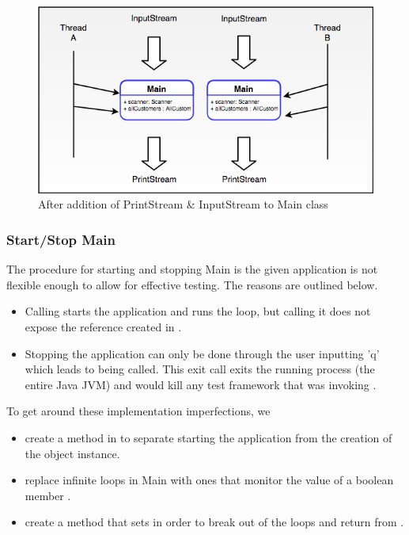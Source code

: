 \begin{figure}[H]
	\centering
	\includegraphics[scale=0.4]{res/STE-Page-3-original.png}
	\caption{After addition of PrintStream \& InputStream to Main class}
\end{figure}
\par

\subsubsection{Start/Stop Main}
\label{sec:start-stop-main}
The procedure for starting and stopping Main is the given application is not flexible enough to allow for effective testing. The reasons are outlined below.
\begin{itemize}
	\item Calling  starts the application and runs the loop, but calling it does not expose the  reference created in . 
	\item Stopping the application can only be done through the user inputting 'q' which leads to  being called. This exit call exits the running process (the entire Java JVM) and would kill any test framework that was invoking .
\end{itemize}

To get around these implementation imperfections, we 
\begin{itemize}
	\item create a method  in  to separate starting the application from the creation of the  object instance. 
	\item replace infinite loops in Main with ones that monitor the value of a boolean member . 
	\item create a method  that sets  in order to break out of the loops and return from .
\end{itemize}

